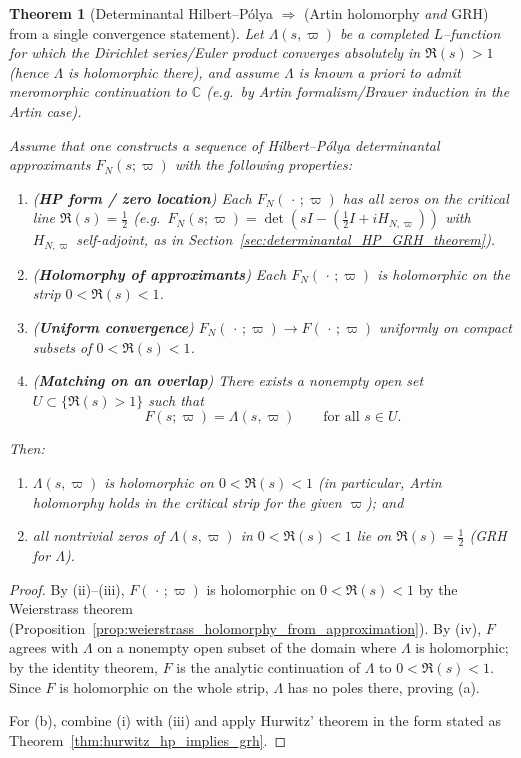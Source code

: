 \documentclass[11pt,oneside]{amsbook}
\numberwithin{equation}{section}
\theoremstyle{plain}
\newtheorem{theorem}{Theorem}[section]
\theoremstyle{definition}
\theoremstyle{remark}
\newcommand{\C}{\mathbb{C}}
\begin{document}
\begin{theorem}[Determinantal Hilbert--P\'olya $\Rightarrow$ (Artin holomorphy \emph{and} GRH) from a single convergence statement]
\label{thm:hp_convergence_implies_holomorphy_and_grh}
Let $\Lambda(s,\varpi)$ be a completed $L$--function for which the Dirichlet series/Euler product converges absolutely in $\Re(s)>1$
(hence $\Lambda$ is holomorphic there), and assume $\Lambda$ is known \emph{a priori} to admit meromorphic continuation to $\C$
(e.g.\ by Artin formalism/Brauer induction in the Artin case).

Assume that one constructs a sequence of Hilbert--P\'olya determinantal approximants $F_N(s;\varpi)$ with the following properties:
\begin{enumerate}[label=(\roman*)]
\item (\textbf{HP form / zero location}) Each $F_N(\,\cdot\,;\varpi)$ has all zeros on the critical line $\Re(s)=\tfrac12$
(e.g.\ $F_N(s;\varpi)=\det(sI-(\tfrac12 I+iH_{N,\varpi}))$ with $H_{N,\varpi}$ self-adjoint, as in Section~\ref{sec:determinantal_HP_GRH_theorem}).
\item (\textbf{Holomorphy of approximants}) Each $F_N(\,\cdot\,;\varpi)$ is holomorphic on the strip $0<\Re(s)<1$.
\item (\textbf{Uniform convergence}) $F_N(\,\cdot\,;\varpi)\to F(\,\cdot\,;\varpi)$ uniformly on compact subsets of $0<\Re(s)<1$.
\item (\textbf{Matching on an overlap}) There exists a nonempty open set $U\subset\{\Re(s)>1\}$ such that
\[
F(s;\varpi)=\Lambda(s,\varpi)\qquad \text{for all }s\in U.
\]
\end{enumerate}
Then:
\begin{enumerate}[label=(\alph*)]
\item $\Lambda(s,\varpi)$ is holomorphic on $0<\Re(s)<1$ (in particular, Artin holomorphy holds in the critical strip for the given $\varpi$); and
\item all nontrivial zeros of $\Lambda(s,\varpi)$ in $0<\Re(s)<1$ lie on $\Re(s)=\tfrac12$ (GRH for $\Lambda$).
\end{enumerate}
\end{theorem}

\begin{proof}
By (ii)--(iii), $F(\,\cdot\,;\varpi)$ is holomorphic on $0<\Re(s)<1$ by the Weierstrass theorem (Proposition~\ref{prop:weierstrass_holomorphy_from_approximation}).
By (iv), $F$ agrees with $\Lambda$ on a nonempty open subset of the domain where $\Lambda$ is holomorphic; by the identity theorem, $F$ is the analytic continuation of $\Lambda$ to $0<\Re(s)<1$.
Since $F$ is holomorphic on the whole strip, $\Lambda$ has no poles there, proving (a).

For (b), combine (i) with (iii) and apply Hurwitz' theorem in the form stated as Theorem~\ref{thm:hurwitz_hp_implies_grh}.
\end{proof}
\end{document}

